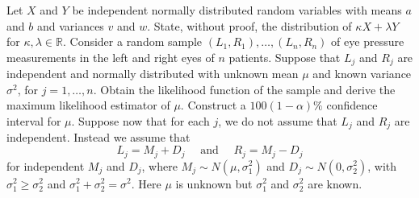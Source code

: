 \documentclass[answers]{exam}
\begin{document}
\begin{questions}
\question%
\begin{subparts}
\subpart Let $X$ and $Y$ be independent normally distributed random variables with means $a$ and $b$ and variances $v$ and $w$. State, without proof, the distribution of $\kappa X+\lambda Y$ for $\kappa, \lambda \in \mathbb{R}$.
\subpart Consider a random sample $(L_{1}, R_{1}), \ldots,(L_{n}, R_{n})$ of eye pressure measurements in the left and right eyes of $n$ patients. Suppose that $L_{j}$ and $R_{j}$ are independent and normally distributed with unknown mean $\mu$ and known variance $\sigma^{2}$, for $j=1, \ldots, n$. Obtain the likelihood function of the sample and derive the maximum likelihood estimator of $\mu$. Construct a $100(1-\alpha) \%$ confidence interval for $\mu$.
\subpart Suppose now that for each $j$, we do not assume that $L_{j}$ and $R_{j}$ are independent. Instead we assume that \[
	L_{j}=M_{j}+D_{j} \quad \text { and } \quad R_{j}=M_{j}-D_{j}
\] for independent $M_{j}$ and $D_{j}$, where $M_{j} \sim N(\mu, \sigma_{1}^{2})$ and $D_{j} \sim N(0, \sigma_{2}^{2})$, with $\sigma_{1}^{2} \geqslant \sigma_{2}^{2}$ and $\sigma_{1}^{2}+\sigma_{2}^{2}=\sigma^{2}$. Here $\mu$ is unknown but $\sigma_{1}^{2}$ and $\sigma_{2}^{2}$ are known.
\end{subparts}

\end{questions}
\end{document}
